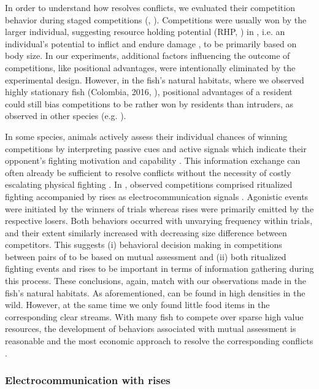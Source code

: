 In order to understand how \lepto{} resolves conflicts, we evaluated their competition behavior during staged competitions (, \citealp{Raab2021}). Competitions were usually won by the larger individual, suggesting resource holding potential (RHP, \citealp{Parker1974}) in \lepto{}, i.e. an individual's potential to inflict and endure damage \citep{Archer1988}, to be primarily based on body size. In our experiments, additional factors influencing the outcome of competitions, like positional advantages, were intentionally eliminated by the experimental design. However, in the fish's natural habitats, where we observed highly stationary fish (Colombia, 2016, ), positional advantages of a resident could still bias competitions to be rather won by residents than intruders, as observed in other species (e.g. \citealp{Alcock1997}). 

In some species, animals actively assess their individual chances of winning competitions by interpreting passive cues and active signals which indicate their opponent's fighting motivation and capability \citep{Cluttonbrock1979, EnquistLeimar1987}. This information exchange can often already be sufficient to resolve conflicts without the necessity of costly escalating physical fighting \citep{Parker1974, Cluttonbrock1979, Jason1990}. In \lepto{}, observed competitions comprised ritualized fighting \citep{Triefenbach2008} accompanied by rises as electrocommunication signals \citep{Smith2013}. Agonistic events were initiated by the winners of trials whereas rises were primarily emitted by the respective losers. Both behaviors occurred with unvarying frequency within trials, and their extent similarly increased with decreasing size difference between competitors. This suggests (i) behavioral decision making in competitions between pairs of \lepto{} to be based on mutual assessment and (ii) both ritualized fighting events and rises to be important in terms of information gathering during this process. These conclusions, again, match with our observations made in the fish's natural habitats. As aforementioned, \lepto{} can be found in high densities in the wild. However, at the same time we only found little food items in the corresponding clear streams. With many fish to compete over sparse high value resources, the development of behaviors associated with mutual assessment is reasonable and the most economic approach to resolve the corresponding conflicts \citep{ArnottElwood2009}.

\subsubsection{Electrocommunication with rises}

